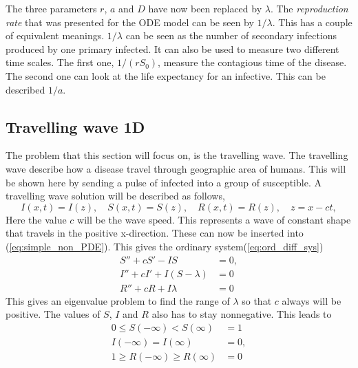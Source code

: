 \documentclass[%
twoside,                 %
final,                   %
10pt]{article}
\begin{document}
The three parameters $r$, $a$ and $D$ have now been replaced by $\lambda$. The \emph{reproduction rate} that was presented for the ODE model can be seen by $1/\lambda $. This has a couple of equivalent meanings. $1/\lambda$ can be seen as the number of secondary infections produced by one primary infected. It can also be used to measure two different time scales. The first one, $1/(rS_0)$, measure the contagious time of the disease. The second one can look at the life expectancy for an infective. This can be described $1/a$. 
\subsection{Travelling wave 1D}
The problem that this section will focus on, is the travelling wave. The travelling wave describe how a disease travel through geographic area of humans. This will be shown here by sending a pulse of infected into a group of susceptible. A travelling wave solution will be described as follows,
\begin{equation}
I(x,t)=I(z),\quad S(x,t)=S(z),\quad R(x,t) = R(z),\quad z = x-ct,
\end{equation}
Here the value $c$ will be the wave speed. This represents a wave of constant shape that travels in the positive x-direction. These can now be inserted into (\ref{eq:simple_non_PDE}). This gives the ordinary system(\ref{eq:ord_diff_sys})
\begin{equation} \label{eq:ord_diff_sys}
	\begin{aligned}
	S'' + cS' - IS &= 0,\\
	I'' + cI' + I(S-\lambda)&=0\\
	R'' + cR  + I\lambda &=0
	\end{aligned}
\end{equation}
This gives an eigenvalue problem to find the range of $\lambda$ so that $c$ always will be positive. The values of $S$, $I$ and $R$ also has to stay nonnegative. This leads to
\begin{equation} 
	\begin{aligned}
	0 \leq S(-\infty) < S(\infty)&=1\\
	I(-\infty)=I(\infty)&=0,\\
	1 \geq R(-\infty)\geq R(\infty) &= 0
	\end{aligned}
\end{equation}

\end{document}
